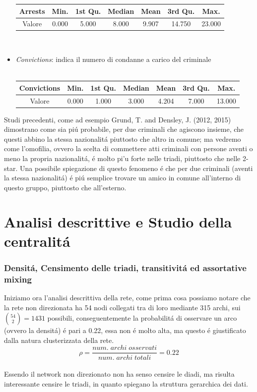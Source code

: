 \documentclass[11pt,a4paper]{report}
\begin{document}
\begin{itemize}
\begin{tabular}{c|c|c|c|c|c |c}
\hline 
\textbf{Arrests} & Min. & 1st Qu. & Median &   Mean& 3rd Qu. &   Max.    \\ 
\hline 
Valore &  0.000 &  5.000 &  8.000 &  9.907&  14.750&  23.000   \\ 
\hline 
\end{tabular} 
\\
\item \emph{Convictions}: indica il numero di condanne a carico del criminale \\\\
\begin{tabular}{c|c|c|c|c|c |c}
\hline 
\textbf{Convictions} & Min. & 1st Qu. & Median &   Mean& 3rd Qu. &   Max.    \\ 
\hline 
Valore &   0.000 &  1.000 &  3.000 &  4.204 &  7.000 & 13.000   \\ 
\hline 
\end{tabular} 



\end{itemize}
Studi precedenti, come ad esempio Grund, T. and Densley, J. (2012, 2015) dimostrano come sia pi\'u probabile, per due criminali che agiscono insieme, che questi abbino la stessa nazionalit\'a piuttosto che altro in comune; ma vedremo come l'omofilia, ovvero la scelta di commettere atti criminali con persone aventi o meno la propria nazionalit\'a, \'e molto pi'u forte nelle triadi, piuttosto che nelle 2-star. Una possibile spiegazione di questo fenomeno \'e che per due criminali (aventi la stessa nazionalit\'a) \'e pi\'u semplice trovare un amico in comune all'interno di questo gruppo, piuttosto che all'esterno.
\chapter{Analisi descrittive e Studio della centralit\'a}
\subsection{Densit\'a, Censimento delle triadi, transitivit\'a ed assortative mixing}
Iniziamo ora l'analisi descrittiva della rete, come prima cosa possiamo notare che la rete non direzionata ha 54 nodi collegati tra di loro mediante 315 archi, sui $\binom{54}{2}= 1431 $ possibili, conseguentemente la probabilit\'a di osservare un arco (ovvero la densit\'a) \'e pari a 0.22, essa non \'e molto alta, ma questo \'e giustificato dalla natura clusterizzata della rete.
$$ \rho= \frac{num. \; archi \; osservati}{num. \; archi \; totali}=0.22 $$
\\
Essendo il network non direzionato non ha senso censire le diadi, ma risulta interessante censire le triadi, in quanto spiegano la struttura gerarchica dei dati.
\\
\end{document}
